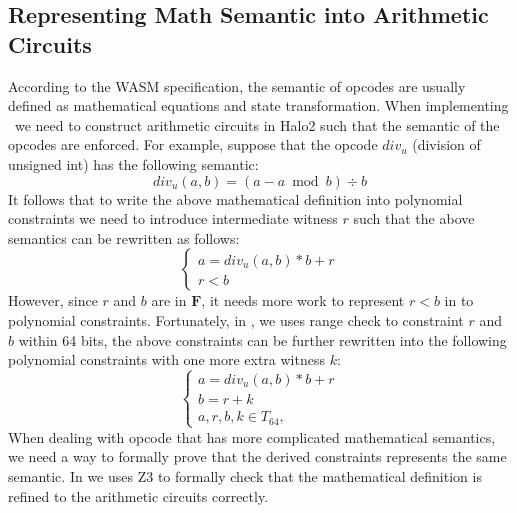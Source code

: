 \subsection{Representing Math Semantic into Arithmetic Circuits}
According to the WASM specification, the semantic of opcodes are usually defined as mathematical equations and state transformation. When implementing \zkwasm \, we need to construct arithmetic circuits in Halo2 such that the semantic of the opcodes are enforced. For example, suppose that the opcode $div_u$ (division of unsigned int) has the following semantic:
\[ div_u(a, b) = (a - a \bmod b) \div b \] 
It follows that to write the above mathematical definition into polynomial constraints we need to introduce intermediate witness $r$ such that the above semantics can be rewritten as follows:
\begin{equation}
\begin{cases}
    a = div_u(a,b) * b + r \\
    r < b
\end{cases}
\end{equation}
However, since $r$ and $b$ are in $\mathbf{F}$, it needs more work to represent $r < b$ in to polynomial constraints. Fortunately, in \zkwasm, we uses range check to constraint $r$ and $b$ within 64 bits, the above constraints can be further rewritten into the following polynomial constraints with one more extra witness $k$: 
\begin{equation}
\begin{cases}
    a = div_u(a,b) * b + r \\
    b = r + k \\
    a, r, b, k\in T_{64}, 
\end{cases}
\end{equation}
When dealing with opcode that has more complicated mathematical semantics, we need a way to formally prove that the derived constraints represents the same semantic. In \zkwasm we uses Z3 to formally check that the mathematical definition is refined to the arithmetic circuits correctly.

